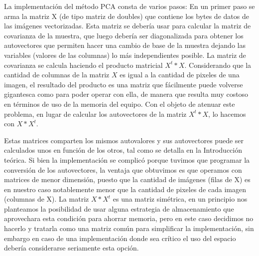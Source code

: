 La implementación del método PCA consta de varios pasos:
En un primer paso se arma la matriz X (de tipo matriz de doubles) que contiene los bytes de datos de las imágenes vectorizadas. Esta matriz se debería usar para calcular la matriz de covarianza de la muestra, que luego debería ser diagonalizada para obtener los autovectores que permiten hacer una cambio de base de la muestra dejando las variables (valores de las columnas) lo más independientes posible.
La matriz de covarianza se calcula haciendo el producto matricial $X^{t} * X$. Considerando que la cantidad de columnas de la matriz $X$ es igual a la cantidad de pixeles de una imagen, el resultado del producto es una matriz que fácilmente puede volverse gigantesca como para poder operar con ella, de manera que resulta muy costoso en términos de uso de la memoria del equipo. Con el objeto de atenuar este problema, en lugar de calcular los autovectores de la matriz $X^{t} * X$, lo hacemos con $X * X^{t}$.
\par Estas matrices comparten los mismos autovalores y sus autovectores puede ser calculados unos en función de los otros, tal como se detalla en la Introducción teórica. Si bien la implementación se complicó porque tuvimos que programar la conversión de los autovectores, la ventaja que obtuvimos es que operamos con matrices de menor dimensión, puesto que la cantidad de imágenes (filas de X) es en nuestro caso notablemente menor que la cantidad de pixeles de cada imagen (columnas de X).
La matriz $X * X^{t}$ es una matriz simétrica, en un principio nos planteamos la posibilidad de usar alguna estrategia de almacenamiento que aprovechara esta condición para ahorrar memoria, pero en este caso decidimos no hacerlo y tratarla como una matriz común para simplificar la implementación, sin embargo en caso de una implementación donde sea crítico el uso del espacio debería considerarse seriamente esta opción.

